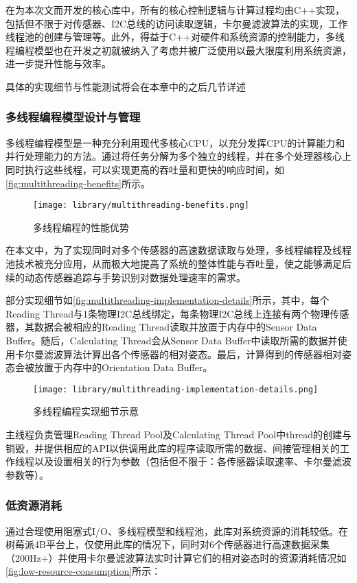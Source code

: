 在为本次文而开发的核心库中，所有的核心控制逻辑与计算过程均由C++实现，包括但不限于对传感器、I2C总线的访问读取逻辑，卡尔曼滤波算法的实现，工作线程池的创建与管理等。此外，得益于C++对硬件和系统资源的控制能力，多线程编程模型也在开发之初就被纳入了考虑并被广泛使用以最大限度利用系统资源，进一步提升性能与效率。

具体的实现细节与性能测试将会在本章中的之后几节详述
\subsubsection{多线程编程模型设计与管理}
多线程编程模型是一种充分利用现代多核心CPU，以充分发挥CPU的计算能力和并行处理能力的方法。通过将任务分解为多个独立的线程，并在多个处理器核心上同时执行这些线程，可以实现更高的吞吐量和更快的响应时间，如\autoref{fig:multithreading-benefits}所示。

\begin{figure}[H]
    \centering
    \texttt{[image: library/multithreading-benefits.png]}
    \caption{\label{fig:multithreading-benefits}多线程编程的性能优势}
\end{figure}

在本文中，为了实现同时对多个传感器的高速数据读取与处理，多线程编程及线程池技术被充分应用，从而极大地提高了系统的整体性能与吞吐量，使之能够满足后续的动态传感器追踪与手势识别对数据处理速率的需求。

部分实现细节如\autoref{fig:multithreading-implementation-details}所示，其中，每个Reading Thread与1条物理I2C总线绑定，每条物理I2C总线上连接有两个物理传感器，其数据会被相应的Reading Thread读取并放置于内存中的Sensor Data Buffer。随后，Calculating Thread会从Sensor Data Buffer中读取所需的数据并使用卡尔曼滤波算法计算出各个传感器的相对姿态。最后，计算得到的传感器相对姿态会被放置于内存中的Orientation Data Buffer。

\begin{figure}[H]
    \centering
    \texttt{[image: library/multithreading-implementation-details.png]}
    \caption{\label{fig:multithreading-implementation-details}多线程编程实现细节示意}
\end{figure}

主线程负责管理Reading Thread Pool及Calculating Thread Pool中thread的创建与销毁，并提供相应的API以供调用此库的程序读取所需的数据、间接管理相关的工作线程以及设置相关的行为参数（包括但不限于：各传感器读取速率、卡尔曼滤波参数等）。

\subsubsection{低资源消耗}
通过合理使用阻塞式I/O、多线程模型和线程池，此库对系统资源的消耗较低。在树莓派4B平台上，仅使用此库的情况下，同时对6个传感器进行高速数据采集（200Hz+）并使用卡尔曼滤波算法实时计算它们的相对姿态时的资源消耗情况如\autoref{fig:low-resource-consumption}所示：

